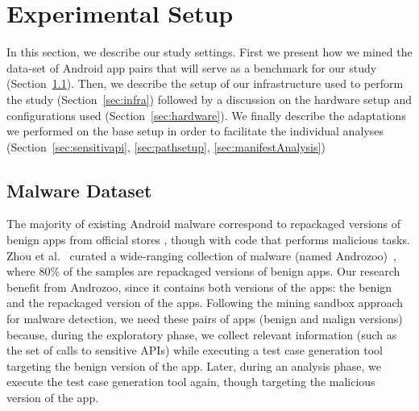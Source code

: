 \section{Experimental Setup}\label{sec:experimentalSetup}


In this section, we describe our study settings. First we present how we mined the data-set of Android app pairs that will serve as a benchmark for our study (Section~\ref{sec:dataset}).  Then, we describe the setup of our infrastructure used to perform the study (Section~\ref{sec:infra}) followed by a discussion on the hardware setup and configurations used (Section~\ref{sec:hardware}). We finally describe the adaptations we performed on the base setup in order to facilitate the individual analyses (Section~\ref{sec:sensitivapi}, \ref{sec:pathsetup}, \ref{sec:manifestAnalysis})

\subsection{Malware Dataset}\label{sec:dataset}

The majority of existing Android malware correspond to repackaged versions of benign apps from official stores , though with code that performs malicious tasks. Zhou et al.~\cite{DBLP:conf/sp/ZhouJ12} curated a wide-ranging collection of malware (named Androzoo)~\cite{DBLP:conf/msr/AllixBKT16}, where 80\% of the samples are repackaged versions of benign apps. Our research benefit from Androzoo, since it contains both versions of the apps: the benign and the repackaged version of the apps. Following the mining sandbox approach for malware detection, we need these pairs of apps (benign and malign versions) because, during the exploratory phase, we collect relevant information (such as the set of calls to sensitive APIs) while executing a test case generation tool targeting the benign version of the app. Later, during an analysis phase, we execute the test case generation tool again, though targeting the malicious version of the app.


